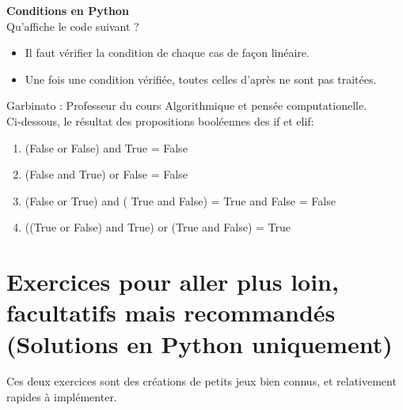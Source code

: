 \begin{Exercice}[20 minutes] \textbf{Conditions en Python}\\
  Qu'affiche le code suivant ?   \\
  
  
   
    \begin{conseil}
      	\begin{itemize}
      		\item Il faut vérifier la condition de chaque cas de façon linéaire.
      		\item Une fois une condition vérifiée, toutes celles d'après ne sont pas traitées.
      	\end{itemize}
        
    \end{conseil}
    \begin{solution}
    
    Garbinato : Professeur du cours Algorithmique et pensée computationelle. \\
    
    Ci-dessous, le résultat des propositions booléennes des if et elif: \\
    
    \begin{enumerate}
    	\item (False or False) and True = False
    	\item (False and True) or False = False
    	\item (False or True) and ( True and False) = True and False = False
    	\item ((True or False) and True) or (True and False) = True
    \end{enumerate}
           
    \end{solution}   
\end{Exercice}


\newpage
\section{Exercices pour aller plus loin, facultatifs mais recommandés (Solutions en Python uniquement)}
Ces deux exercices sont des créations de petits jeux bien connus, et relativement rapides à implémenter. \\


